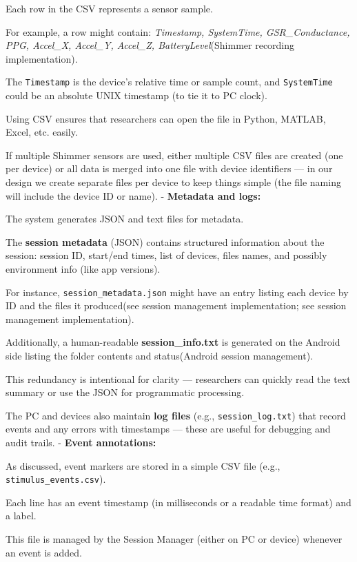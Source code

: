 Each row in the CSV represents a sensor sample.

For example, a row might contain: \textit{Timestamp, SystemTime, GSR\_Conductance,
PPG, Accel\_X, Accel\_Y, Accel\_Z, BatteryLevel}(Shimmer recording implementation).

The \texttt{Timestamp} is the device's relative time or sample count, and
\texttt{SystemTime} could be an absolute UNIX timestamp (to tie it to PC clock).

Using CSV ensures that researchers can open the file in Python, MATLAB, Excel, etc.
easily.

If multiple Shimmer sensors are used, either multiple CSV files are created (one per
device) or all data is merged into one file with device identifiers --- in our design
we create separate files per device to keep things simple (the file naming will
include the device ID or name).  - \textbf{Metadata and logs:}

The system generates JSON and text files for metadata.

The \textbf{session metadata}
 (JSON) contains structured information about the session: session ID, start/end
 times, list of devices, files names, and possibly environment info (like app
 versions).

For instance, \texttt{session\_metadata.json} might have an entry listing each device
by ID and the files it produced(see session management implementation; see session
management implementation).

Additionally, a human-readable \textbf{session\_info.txt}
 is generated on the Android side listing the folder contents and status(Android
 session management).

This redundancy is intentional for clarity --- researchers can quickly read the text
summary or use the JSON for programmatic processing.

The PC and devices also maintain \textbf{log files}
 (e.g., \texttt{session\_log.txt}) that record events and any errors with timestamps
 --- these are useful for debugging and audit trails.  - \textbf{Event annotations:}

As discussed, event markers are stored in a simple CSV file (e.g.,
\texttt{stimulus\_events.csv}).

Each line has an event timestamp (in milliseconds or a readable time format) and a
label.

This file is managed by the Session Manager (either on PC or device) whenever an
event is added.

